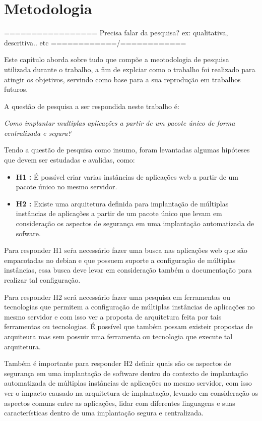 \chapter{Metodologia}
\label{cap-metodologia}

================= Precisa falar da pesquisa? ex: qualitativa, descritiva.. etc ============/============

Este capítulo aborda sobre tudo que compõe a meotodologia de pesquisa utilizada
durante o trabalho, a fim de explciar como o trabalho foi realizado para atingir os
objetivos, servindo como base para a sua reprodução em trabalhos futuros.

A questão de pesquisa a ser respondida neste trabalho é:

\begin{center}
  \textit{
    Como implantar multiplas aplicações a partir de um pacote único
    de forma centralizada e segura?
}
\end{center}

Tendo a questão de pesquisa como insumo, foram levantadas algumas hipóteses que devem
ser estudadas e avalidas, como:

\begin{itemize}
  \item  \textbf{H1 :} É possível criar varias instâncias de aplicações
  web a partir de um pacote único no mesmo servidor.
   \item  \textbf{H2 :} Existe uma arquitetura definida para implantação de
   múltiplas instâncias de aplicações a partir de um pacote único que levam em consideração
   os aspectos de segurança em uma implantação automatizada de sofware.
\end{itemize}

Para responder H1 seŕa necessário fazer uma busca nas aplicações web que são
empacotadas no debian e que possuem suporte a configuração de múltiplas instâncias,
essa busca deve levar em consideração também a documentação para realizar tal
configuração.

Para responder H2 será necessário fazer uma pesquisa em ferramentas ou tecnologias que
permitem a configuração de múltiplas instâncias de aplicações no mesmo servidor e com
isso ver a proposta de arquitetura feita por tais ferramentas ou tecnologias. É
possível que também possam existeir propostas de arquiteura mas sem possuir uma
ferramenta ou tecnologia que execute tal arquitetura.

Também é importante para responder H2 definir quais são os aspectos de segurança em
uma implantação de software dentro do contexto de implantação automatizada de múltiplas instâncias de aplicações no mesmo servidor,
com isso ver o impacto causado na arquitetura de implantação, levando em consideração os
aspectos comuns entre as aplicações, lidar com diferentes linguagens e suas características
dentro de uma implantação segura e centralizada.

